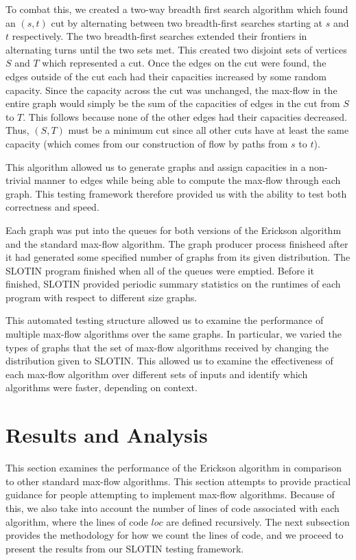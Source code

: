 \documentclass[12pt]{article}
\begin{document}
To combat this, we created a two-way breadth first search algorithm which found an $(s,t)$ cut by alternating between two breadth-first searches starting at $s$ and $t$ respectively. The two breadth-first searches extended their frontiers in alternating turns until the two sets met. This created two disjoint sets of vertices $S$ and $T$ which represented a cut. Once the edges on the cut were found, the edges outside of the cut each had their capacities increased by some random capacity. Since the capacity across the cut was unchanged, the max-flow in the entire graph would simply be the sum of the capacities of edges in the cut from $S$ to $T$. This follows because none of the other edges had their capacities decreased. Thus, $(S,T)$ must be a minimum cut since all other cuts have at least the same capacity (which comes from our construction of flow by paths from $s$ to $t$). 

This algorithm allowed us to generate graphs and assign capacities in a non-trivial manner to edges while being able to compute the max-flow through each graph. This testing framework therefore provided us with the ability to test both correctness and speed.

Each graph was put into the queues for both versions of the Erickson algorithm and the standard max-flow algorithm. The graph producer process finisheed after it had generated some specified number of graphs from its given distribution. The SLOTIN program finished when all of the queues were emptied. Before it finished, SLOTIN provided periodic summary statistics on the runtimes of each program with respect to different size graphs. 

This automated testing structure allowed us to examine the performance of multiple max-flow algorithms over the same graphs. In particular, we varied the types of graphs that the set of max-flow algorithms received by changing the distribution given to SLOTIN. This allowed us to examine the effectiveness of each max-flow algorithm over different sets of inputs and identify which algorithms were faster, depending on context. 

\section{Results and Analysis}

This section examines the performance of the Erickson algorithm in comparison to other standard max-flow algorithms. This section attempts to provide practical guidance for people attempting to implement max-flow algorithms. Because of this, we also take into account the number of lines of code associated with each algorithm, where the lines of code $loc$ are defined recursively. The next subsection provides the methodology for how we count the lines of code, and we proceed to present the results from our SLOTIN testing framework.
\end{document}
